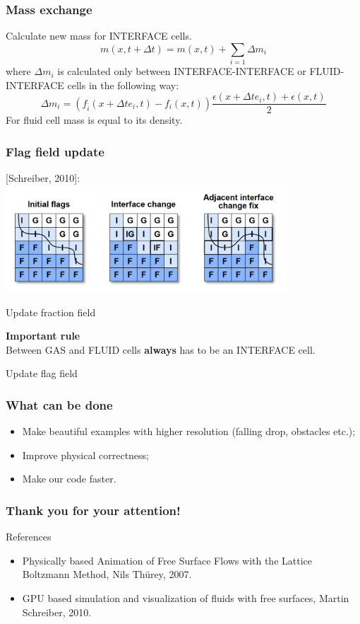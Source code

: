 \documentclass[10pt,a4paper]{beamer}
\DeclareRobustCommand{\mybox}[2][gray!20]{%
\begin{tcolorbox}[   %
        breakable,
        left=0pt,
        right=0pt,
        top=0pt,
        bottom=0pt,
        colback=#1,
        colframe=#1,
        width=\dimexpr\textwidth\relax, 
        enlarge left by=0mm,
        boxsep=5pt,
        arc=0pt,outer arc=0pt,
        ]
        #2
\end{tcolorbox}
}
\begin{document}
\begin{frame}
  \frametitle{Mass exchange}
  Calculate new mass for INTERFACE cells.
    \begin{equation}
      m\left(x, t+\Delta t\right) = m\left(x,t\right)+\sum_{i=1}\Delta m_i
    \end{equation}
    where $\Delta m_i$ is calculated only between INTERFACE-INTERFACE or
    FLUID-INTERFACE cells in the following way:
    \begin{equation}
      \Delta m_i = \left(f_{\bar{i}}\left(x+\Delta te_i,t\right)-f_i\left(x,t\right)\right)\frac{\epsilon\left(x+\Delta te_i,t\right)+\epsilon\left(x,t\right)}{2}
    \end{equation}
    For fluid cell mass is equal to its density.
\end{frame}

\begin{frame}
  \frametitle{Flag field update}
 [Schreiber, 2010]:
  \includegraphics[height=4cm]{interface} 


  Update fraction field
  \mybox[green!20]{
    \textbf{Important rule}\\
    Between GAS and FLUID cells \textbf{always} has to be
    an INTERFACE cell.
  }
  Update flag field
\end{frame}
\begin{frame}
  \frametitle{What can be done}
  \begin{itemize}
  \item Make beautiful examples with higher resolution (falling drop, obstacles
    etc.);
    \item Improve physical correctness;
  \item Make our code faster.
  \end{itemize}
\end{frame}

\begin{frame}
\frametitle{Thank you for your attention!}
\end{frame}


\begin{frame}
  References
  \begin{itemize}
  \item Physically based Animation of Free Surface Flows with the Lattice
    Boltzmann Method, Nils Thürey, 2007.
  \item GPU based simulation and visualization of fluids with free surfaces, Martin Schreiber, 2010.
  \end{itemize}
\end{frame}
\end{document}
